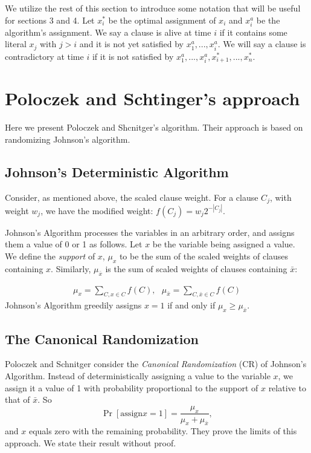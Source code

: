 \documentclass[11pt,letter]{article}
\numberwithin{theorem}{section}
\begin{document}
We utilize the rest of this section to introduce some notation that will be useful for sections 3 and 4.
Let $x_i^*$ be the optimal assignment of $x_i$ and $x_i^{a}$ be the algorithm's assignment. We say a clause is alive
at time $i$ if it contains some literal $x_j$ with $j > i$ and it is not yet satisfied by $x_1^a,...,x_i^a$.
We will say a clause is contradictory at time $i$ if it is not satisfied by $x_1^a,...,x_i^a,x_{i+1}^*,...,x_n^*$.


\section{Poloczek and Schtinger's approach}\label{S:PS}

Here we present Poloczek and Shcnitger's algorithm. Their approach is based on randomizing Johnson's algorithm.

\subsection*{Johnson's Deterministic Algorithm}

Consider, as mentioned above, the scaled clause weight. For a clause $C_j$, with weight $w_j$, we have the modified weight:  $f(C_j) = w_j 2^{-|C_j|}$.

Johnson's Algorithm processes the variables in an arbitrary order, and assigns them a value of 0 or 1 as follows. Let $x$ be the variable being assigned a value. We define the \emph{support} of $x$, $\mu_x$ to be the sum of the scaled weights of clauses containing $x$. Similarly, $\mu_{\bar{x}}$ is the sum of scaled weights of clauses containing $\bar{x}$:

\begin{align*}
\mu_x = \sum_{C,x\in C}f(C), \,\,\,\, \mu_{\bar{x}} =\sum_{C,\bar{x}\in C}f(C)
\end{align*}
Johnson's Algorithm greedily assigns $x=1$ if and only if $\mu_x \ge \mu_{\bar{x}}$.

\subsection*{The Canonical Randomization}
Poloczek and Schnitger consider the \emph{Canonical Randomization} (CR) of Johnson's Algorithm. Instead of deterministically assigning a value to the variable $x$, we assign it a value of 1 with probability proportional to the support of $x$ relative to that of $\bar{x}$. So
\[\Pr[\mathrm{assign } x=1] = \frac{\mu_x}{\mu_x + \mu_{\bar{x}}},\] and $x$ equals zero with the remaining probability. They prove the limits of this approach. We state their result without proof. 
\end{document}
